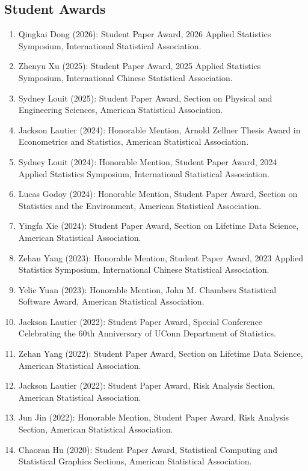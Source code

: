 \documentclass[Statistics]{vita}
\begin{document}
\begin{vita}
    \subsection{Student Awards}
    \begin{enumerate}
    \item Qingkai Dong (2026): Student Paper Award, 2026 Applied Statistics Symposium, International Statistical Association.
    \item Zhenyu Xu (2025): Student Paper Award, 2025 Applied Statistics Symposium, International Chinese Statistical Association.
    \item Sydney Louit (2025): Student Paper Award, Section on Physical and Engineering Sciences, American Statistical Association.
    \item Jackson Lautier (2024): Honorable Mention, Arnold Zellner Thesis Award in Econometrics and Statistics, American Statistical Association.
    \item Sydney Louit (2024): Honorable Mention, Student Paper Award, 2024 Applied Statistics Symposium, International Statistical Association.
    \item Lucas Godoy (2024): Honorable Mention, Student Paper Award, Section on Statistics and the Environment, American Statistical Association.
    \item Yingfa Xie (2024): Student Paper Award, Section on Lifetime Data Science, American Statistical Association.
    \item Zehan Yang (2023): Honorable Mention, Student Paper Award, 2023 Applied Statistics Symposium, International Chinese Statistical Association.
    \item Yelie Yuan (2023): Honorable Mention, John M. Chambers Statistical Software Award, American Statistical Association.
    \item Jackson Lautier (2022): Student Paper Award, Special Conference Celebrating the 60th Anniversary of UConn Department of Statistics.
    \item Zehan Yang (2022): Student Paper Award, Section on Lifetime Data Science, American Statistical Association.
    \item Jackson Lautier (2022): Student Paper Award, Risk Analysis Section, American Statistical Association.
    \item Jun Jin (2022): Honorable Mention, Student Paper Award, Risk Analysis Section, American Statistical Association.
    \item Chaoran Hu (2020): Student Paper Award, Statistical Computing and Statistical Graphics Sections, American Statistical Association.

\end{enumerate}
\end{vita}
\end{document}
